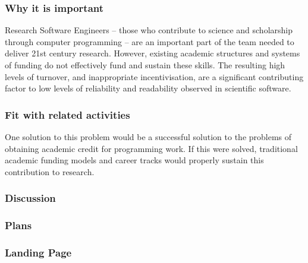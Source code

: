 \subsubsection{Why it is important}

Research Software Engineers -- those who contribute to science and scholarship
through computer programming -- are an important part of the team
needed to deliver 21st century research. However, existing academic structures
and systems of funding do not effectively fund and sustain these skills.
The resulting high levels of turnover, and inappropriate incentivisation,
are a significant contributing factor to low levels of reliability and
readability observed in scientific software.

\subsubsection{Fit with related activities}

One solution to this problem would be a successful solution to the problems of
obtaining academic credit for programming work. If this were solved, traditional
academic funding models and career tracks would properly sustain this
contribution to research.

\subsubsection{Discussion}

\subsubsection{Plans}

\subsubsection{Landing Page}
